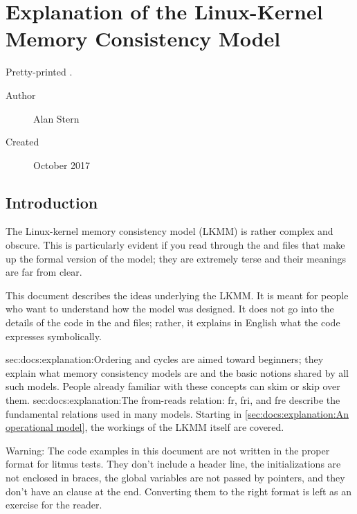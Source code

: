 \section{Explanation of the Linux-Kernel Memory Consistency Model}
\label{sec:docs:explanation}

\begin{Note}
  Pretty-printed .
\end{Note}

\begin{Note}
\begin{description}
\item[Author] Alan Stern 
\item[Created] October 2017
\end{description}
\end{Note}

\subsection{Introduction}

The Linux-kernel memory consistency model (LKMM) is rather complex and
obscure.
This is particularly evident if you read through the
 and  files that
make up the formal version of the model; they are extremely terse and
their meanings are far from clear.

This document describes the ideas underlying the LKMM\@.
It is meant for people who want to understand how the model was designed.
It does not go into the details of the code in the  and
 files; rather, it explains in English what the code
expresses symbolically.

%
  {sec:docs:explanation:Ordering and cycles} are aimed
toward beginners; they explain what memory consistency models are and
the basic notions shared by all such models.
People already familiar with these concepts can skim or skip over them.
%
 {sec:docs:explanation:The from-reads relation: fr, fri, and fre}
describe the fundamental relations used in many models.
Starting in \cref{sec:docs:explanation:An operational model},
the workings of the LKMM itself are covered.

\begin{Warn}
  Warning:
  The code examples in this document are not written in the proper format
  for litmus tests.
  They don't include a header line, the initializations are not enclosed
  in braces, the global variables are not passed by pointers, and they
  don't have an  clause at the end.
  Converting them to the right format is left as an exercise for the reader.
\end{Warn}

